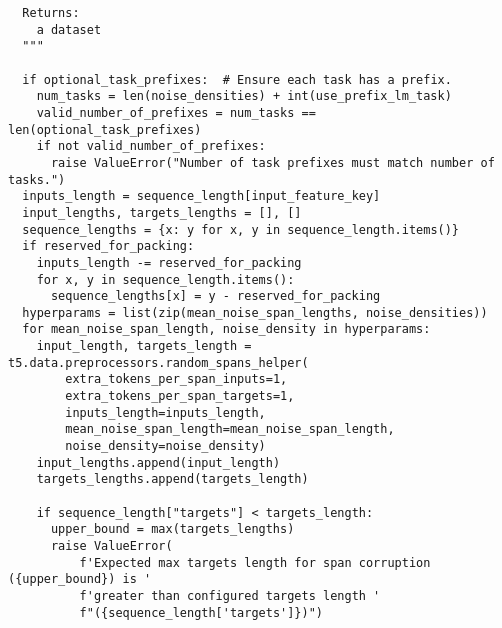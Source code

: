 \documentclass[10pt]{article}
\begin{document}
\begin{lstlisting}
  Returns:
    a dataset
  """

  if optional_task_prefixes:  # Ensure each task has a prefix.
    num_tasks = len(noise_densities) + int(use_prefix_lm_task)
    valid_number_of_prefixes = num_tasks == len(optional_task_prefixes)
    if not valid_number_of_prefixes:
      raise ValueError("Number of task prefixes must match number of tasks.")
  inputs_length = sequence_length[input_feature_key]
  input_lengths, targets_lengths = [], []
  sequence_lengths = {x: y for x, y in sequence_length.items()}
  if reserved_for_packing:
    inputs_length -= reserved_for_packing
    for x, y in sequence_length.items():
      sequence_lengths[x] = y - reserved_for_packing
  hyperparams = list(zip(mean_noise_span_lengths, noise_densities))
  for mean_noise_span_length, noise_density in hyperparams:
    input_length, targets_length = t5.data.preprocessors.random_spans_helper(
        extra_tokens_per_span_inputs=1,
        extra_tokens_per_span_targets=1,
        inputs_length=inputs_length,
        mean_noise_span_length=mean_noise_span_length,
        noise_density=noise_density)
    input_lengths.append(input_length)
    targets_lengths.append(targets_length)

    if sequence_length["targets"] < targets_length:
      upper_bound = max(targets_lengths)
      raise ValueError(
          f'Expected max targets length for span corruption ({upper_bound}) is '
          f'greater than configured targets length '
          f"({sequence_length['targets']})")


\end{lstlisting}
\end{document}

